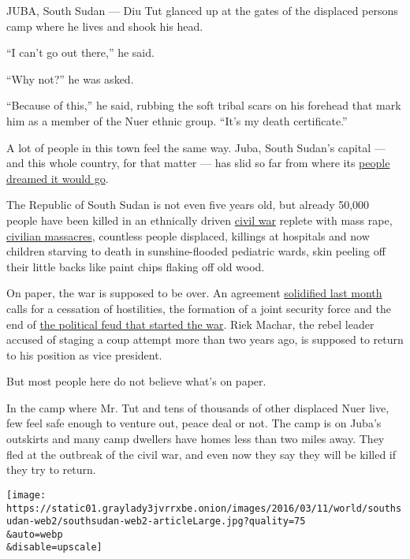 JUBA, South Sudan --- Diu Tut glanced up at the gates of the displaced
persons camp where he lives and shook his head.

``I can't go out there,'' he said.

``Why not?'' he was asked.

``Because of this,'' he said, rubbing the soft tribal scars on his
forehead that mark him as a member of the Nuer ethnic group. ``It's my
death certificate.''

A lot of people in this town feel the same way. Juba, South Sudan's
capital --- and this whole country, for that matter --- has slid so far
from where its
\href{http://www.nytimes3xbfgragh.onion/2011/07/10/world/africa/10sudan.html}{people
dreamed it would go}.

The Republic of South Sudan is not even five years old, but already
50,000 people have been killed in an ethnically driven
\href{http://www.nytimes3xbfgragh.onion/2013/12/25/world/africa/south-sudan-crisis.html}{civil
war} replete with mass rape,
\href{http://www.nytimes3xbfgragh.onion/2015/06/23/world/africa/as-south-sudan-crisis-worsens-there-is-no-more-country.html}{civilian
massacres}, countless people displaced, killings at hospitals and now
children starving to death in sunshine-flooded pediatric wards, skin
peeling off their little backs like paint chips flaking off old wood.

On paper, the war is supposed to be over. An agreement
\href{http://www.nytimes3xbfgragh.onion/2016/02/12/world/africa/south-sudan-leader-takes-major-step-to-ending-conflict.html}{solidified
last month} calls for a cessation of hostilities, the formation of a
joint security force and the end of
\href{http://www.nytimes3xbfgragh.onion/2014/01/01/world/africa/old-rivalries-reignited-a-fuse-in-south-sudan.html}{the
political feud that started the war}. Riek Machar, the rebel leader
accused of staging a coup attempt more than two years ago, is supposed
to return to his position as vice president.

But most people here do not believe what's on paper.

In the camp where Mr. Tut and tens of thousands of other displaced Nuer
live, few feel safe enough to venture out, peace deal or not. The camp
is on Juba's outskirts and many camp dwellers have homes less than two
miles away. They fled at the outbreak of the civil war, and even now
they say they will be killed if they try to return.

\texttt{[image: https://static01.graylady3jvrrxbe.onion/images/2016/03/11/world/southsudan-web2/southsudan-web2-articleLarge.jpg?quality=75\\\&auto=webp\\\&disable=upscale]}

